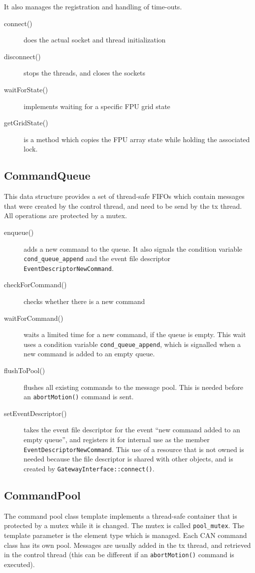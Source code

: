 \documentclass[fontsize=12,a4paper]{scrartcl}
\begin{document}
It also manages the registration and handling of time-outs.

\begin{description}
  \item[connect()] does the actual socket and thread initialization
  \item[disconnect()] stops the threads, and closes the sockets
  \item[waitForState()] implements waiting for a specific FPU grid state
  \item[getGridState()] is a method which copies the FPU array
    state while holding the associated lock.
\end{description}

\subsection{CommandQueue}
This data structure provides a set of thread-safe FIFOs which contain
messages that were created by the control thread, and need to be send
by the tx thread.  All operations are protected by a mutex.

\begin{description}
\item[enqueue()] adds a new command to the queue. It also
  signals the condition variable
    \texttt{cond\_queue\_append} and the event file descriptor \texttt{EventDescriptorNewCommand}.
  \item[checkForCommand()] checks whether there is a new command
  \item[waitForCommand()] waits a limited time for a new command,
    if the queue is empty. This wait uses a condition variable
    \texttt{cond\_queue\_append}, which is signalled when
    a new command is added to an empty queue.
  \item[flushToPool()] flushes all existing commands to the
    message pool. This is needed before an \texttt{abortMotion()}
    command is sent.
  \item[setEventDescriptor()] takes the event file descriptor for the
    event ``new command added to an empty queue'', and registers it
    for internal use as the member
    \texttt{EventDescriptorNewCommand}. This use of a resource that is
    not owned is needed because the file descriptor is shared with
    other objects, and is created by
    \texttt{GatewayInterface::connect()}.

\end{description}

\subsection{CommandPool}
The command pool class template implements a thread-safe container
that is protected by a mutex while it is changed. The mutex is called
\texttt{pool\_mutex}. The template parameter is the element type which
is managed. Each CAN command class has its own pool. Messages are
usually added in the tx thread, and retrieved in the control thread
(this can be different if an \texttt{abortMotion()} command is
executed).
\end{document}
